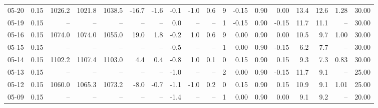 \begin{threeparttable}
{\begin{tabular}{lrrrrrrrrrrrrrrrrr}
  05-20 &     0.15 & 1026.2 & 1021.8 & 1038.5 &      -16.7 &           -1.6 &                      -0.1 &                     -1.0 &                 0.6 &              9 &      -0.15 &      0.90 &           0.00 &             13.4 &                12.6 &            1.28 &                  30.00 \\
  05-19 &     0.15 &     -- &     -- &     -- &         -- &             -- &                       0.0 &                       -- &                  -- &              1 &      -0.15 &      0.90 &          -0.15 &             11.7 &                11.1 &              -- &                  30.00 \\
  05-16 &     0.15 & 1074.0 & 1074.0 & 1055.0 &       19.0 &            1.8 &                      -0.2 &                      1.0 &                 0.6 &              9 &       0.00 &      0.90 &           0.00 &             10.5 &                 9.7 &            1.00 &                  30.00 \\
  05-15 &     0.15 &     -- &     -- &     -- &         -- &             -- &                      -0.5 &                       -- &                  -- &              1 &       0.00 &      0.90 &          -0.15 &              6.2 &                 7.7 &              -- &                  30.00 \\
  05-14 &     0.15 & 1102.2 & 1107.4 & 1103.0 &        4.4 &            0.4 &                      -0.8 &                      1.0 &                 0.1 &              0 &       0.15 &      0.90 &           0.15 &              9.3 &                 7.3 &            0.83 &                  30.00 \\
  05-13 &     0.15 &     -- &     -- &     -- &         -- &             -- &                      -1.0 &                       -- &                  -- &              2 &       0.00 &      0.90 &          -0.15 &             11.7 &                 9.1 &              -- &                  25.00 \\
  05-12 &     0.15 & 1060.0 & 1065.3 & 1073.2 &       -8.0 &           -0.7 &                      -1.1 &                     -1.0 &                 0.2 &              0 &       0.15 &      0.90 &           0.15 &             10.9 &                 9.1 &            1.01 &                  25.00 \\
  05-09 &     0.15 &     -- &     -- &     -- &         -- &             -- &                      -1.4 &                       -- &                  -- &              1 &       0.00 &      0.90 &           0.00 &              9.1 &                 9.2 &              -- &                  20.00 \\

\end{tabular}}
\end{threeparttable}
